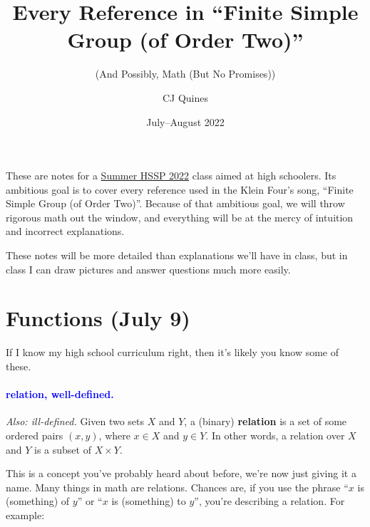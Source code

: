 \documentclass[11pt,paper=letter]{scrartcl}
\renewcommand{\bluebf}[1]{{\bfseries \color{Blue} #1}}
\renewcommand\wp[1]{\paragraph{\textcolor{Blue}{#1.}} \hspace{-1em}}
\newcommand\wl[1]{\label{w:#1}}
\newcommand\oww[1]{\textit{Also: #1.}}
\begin{document}
\title{Every Reference in ``Finite Simple Group (of Order Two)''}
\subtitle{(And Possibly, Math (But No Promises))}
\author{CJ Quines}
\date{July--August 2022}

\maketitle

These are notes for a \href{https://esp.mit.edu/learn/HSSP/2022_Summer/catalog#class_15041}{Summer HSSP 2022} class aimed at high schoolers. Its ambitious goal is to cover every reference used in the Klein Four's song, ``Finite Simple Group (of Order Two)''. Because of that ambitious goal, we will throw rigorous math out the window, and everything will be at the mercy of intuition and incorrect explanations.

These notes will be more detailed than explanations we'll have in class, but in class I can draw pictures and answer questions much more easily.

\section{Functions (July 9)}

If I know my high school curriculum right, then it's likely you know some of these.

\wp{relation, well-defined}
\wl{relation}
\wl{well-defined}
\oww{ill-defined}
Given two sets $X$ and $Y$, a (binary) \bluebf{relation} is a set of some ordered pairs $(x, y)$, where $x \in X$ and $y \in Y$. In other words, a relation over $X$ and $Y$ is a subset of $X \times Y$.

This is a concept you've probably heard about before, we're now just giving it a name. Many things in math are relations. Chances are, if you use the phrase ``$x$ is (something) of $y$'' or ``$x$ is (something) to $y$'', you're describing a relation. For example:
\end{document}
